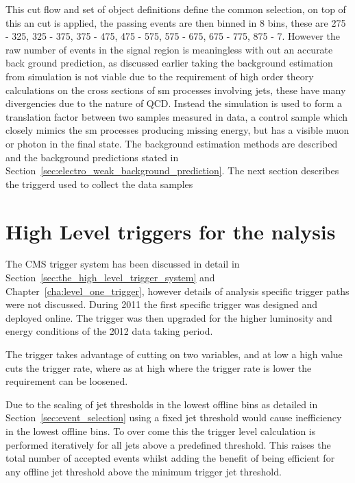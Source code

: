 This cut flow and set of object definitions define the common selection, on top 
of this an \alt cut is applied, the passing events are then binned in 8 \HT 
bins, these are \unit{275}{\GeV} - \unit{325}{\GeV}, \unit{325}{\GeV} - 
\unit{375}{\GeV}, \unit{375}{\GeV} - \unit{475}{\GeV}, \unit{475}{\GeV} - 
\unit{575}{\GeV}, \unit{575}{\GeV} - \unit{675}{\GeV}, \unit{675}{\GeV} - 
\unit{775}{\GeV}, \unit{875}{\GeV} - \unit{7}{\TeV}.
However the raw number of events in the signal region is meaningless with out 
an accurate back ground prediction, as discussed earlier taking the background 
estimation from simulation is not viable due to the requirement of high order 
theory calculations on the cross sections of \ac{sm} processes involving 
jets, these have many divergencies due to the nature of QCD. Instead the 
simulation is used to form a translation factor between two samples measured in 
data, a control sample which closely mimics the \ac{sm} processes 
producing missing energy, but has a visible muon or photon in the final state. 
The background estimation methods are described and the background predictions 
stated in Section~\ref{sec:electro_weak_background_prediction}.
The next section describes the triggerd used to collect the data samples

\section{High Level triggers for the \texorpdfstring{\alt} analysis} %
\label{sec:high_level_triggers_for_the_alt_analysis}
The CMS trigger system has been discussed in detail in 
Section~\ref{sec:the_high_level_trigger_system} and 
Chapter~\ref{cha:level_one_trigger}, however details of analysis specific 
trigger paths were not discussed. During 2011 the first \alt specific trigger 
was designed and deployed online. The trigger was then upgraded for the higher 
luminosity and energy conditions of the 2012 data taking period.


The trigger takes advantage of cutting on two variables, \HT and \alt at low 
\HT a high \alt value cuts the trigger rate, where as at high \HT where the
trigger rate is lower the \alt requirement can be loosened.

Due to the scaling of jet thresholds in the lowest offline \HT bins as detailed 
in Section~\ref{sec:event_selection} using a fixed jet threshold would cause 
inefficiency in the lowest offline \HT bins. To over come this the trigger 
level \alt calculation is performed iteratively for all jets above a predefined 
threshold. This raises the total number of accepted events whilst adding the 
benefit of being efficient for any offline jet threshold above the minimum 
trigger jet threshold.

